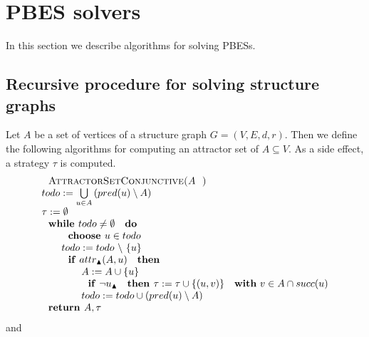                       

\section{PBES solvers}

In this section we describe algorithms for solving PBESs.

\subsection{Recursive procedure for solving structure graphs}

Let $A$ be a set of vertices of a structure graph $G=(V,E,d,r)$. Then we
define the following algorithms for computing an attractor set of $%
A\subseteq V$. As a side effect, a strategy $\tau $ is computed.%
\begin{equation*}
\begin{array}{l}
\text{\textsc{AttractorSetConjunctive(}}A\text{\textsc{)}} \\ 
todo:=\bigcup\limits_{u\in A}\left( pred(u)\setminus A\right)  \\ 
\tau :=\emptyset  \\ 
\text{\textbf{while }}todo\neq \emptyset \text{ \textbf{do}} \\ 
\qquad \text{\textbf{choose }}u\in todo \\ 
\qquad todo:=todo\ \backslash \ \{u\} \\ 
\qquad \text{\textbf{if} }attr_{\blacktriangle }(A,u)\text{ \textbf{then}}
\\ 
\qquad \qquad A:=A\cup \{u\} \\ 
\qquad \qquad \text{\textbf{if} }\lnot u_{\blacktriangle }\text{ \textbf{%
then }}\tau :=\tau \cup \{(u,v)\}\text{ \textbf{with} }v\in A\cap succ(u) \\ 
\qquad \qquad todo:=todo\cup \left( pred(u)\setminus A\right)  \\ 
\text{\textbf{return }}A,\tau 
\end{array}%
\end{equation*}%
and%
